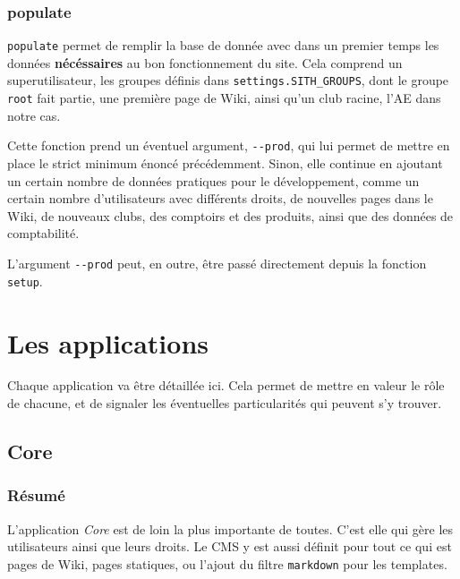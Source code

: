 \documentclass[a4paper]{report}
\begin{document}
\subsection{populate}
\label{sub:populate}
\par \verb#populate# permet de remplir la base de donnée avec dans un premier temps les données \textbf{nécéssaires} au
bon fonctionnement du site. Cela comprend un superutilisateur, les groupes définis dans \verb#settings.SITH_GROUPS#,
dont le groupe \verb#root# fait partie, une première page de Wiki, ainsi qu'un club racine, l'AE dans notre cas.
\par Cette fonction prend un éventuel argument, \verb#--prod#, qui lui permet de mettre en place le strict minimum
énoncé précédemment. Sinon, elle continue en ajoutant un certain nombre de données pratiques pour le développement,
comme un certain nombre d'utilisateurs avec différents droits, de nouvelles pages dans le Wiki, de nouveaux clubs, des
comptoirs et des produits, ainsi que des données de comptabilité.
\par L'argument \verb#--prod# peut, en outre, être passé directement depuis la fonction \verb#setup#.

\chapter{Les applications}
\label{cha:les_applications}
\par Chaque application va être détaillée ici. Cela permet de mettre en valeur le rôle de chacune, et de signaler les
éventuelles particularités qui peuvent s'y trouver.

\section{Core}
\label{sec:core}
\subsection{Résumé}
\label{sub:r_sum_}
\par L'application \emph{Core} est de loin la plus importante de toutes. C'est elle qui gère les utilisateurs ainsi que
leurs droits. Le CMS y est aussi définit pour tout ce qui est pages de Wiki, pages statiques, ou l'ajout du filtre
\verb#markdown# pour les templates.
\end{document}
